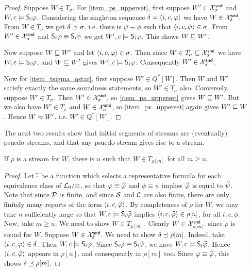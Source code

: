 \begin{proof}

    Suppose $W \in T_\sigma$. For \cref{item_ps_upperset}, first suppose $W'
    \in \Xsnd_\sigma$ and $W, c \models \S_i\phi$.  Considering the singleton
    sequence $\delta = \tuple{i, c, \phi}$ we have $W \in \Xsnd_\delta$. From
    $W \in T_\sigma$ we get $\delta \seqss \sigma$, i.e. there is $\psi \equiv
    \phi$ such that $\tuple{i, c, \psi} \in \sigma$. From $W' \in \Xsnd_\sigma$
    and $\S_i\phi \equiv \S_i\psi$ we get $W', c \models \S_i\phi$.  This shows
    $W \specleq W'$.

    Now suppose $W \specleq W'$ and let $\tuple{i, c, \phi} \in \sigma$. Then
    since $W \in T_\sigma \subseteq \Xsnd_\sigma$ we have $W, c \models
    \S_i\phi$, and $W \specleq W'$ gives $W', c \models \S_i\phi$. Consequently
    $W' \in \Xsnd_\sigma$.

    Now for \cref{item_tsigma_qstar}, first suppose $W' \in Q^*[W]$. Then $W$
    and $W'$ satisfy exactly the same soundness statements, so $W' \in
    T_\sigma$ also.
    Conversely, suppose $W' \in T_\sigma$. Then $W' \in \Xsnd_\sigma$, so
    \cref{item_ps_upperset} gives $W \specleq W'$.  But we also have $W' \in
    T_\sigma$ and $W \in \Xsnd_\sigma$, so \cref{item_ps_upperset} again gives
    $W' \specleq W$. Hence $W \speceq W'$, i.e. $W' \in Q^*[W]$.
\end{proof}

The next two results show that initial segments of streams are (eventually)
psuedo-streams, and that any psuedo-stream gives rise to a stream.

\begin{lemma}
    \label{lemma_stream_to_pseudostream}
    If $\rho$ is a stream for $W$, there is $n$ such that $W \in T_{\rho[m]}$
    for all $m \ge n$.
\end{lemma}

\begin{proof}

    Let $\repr{\cdot}$ be a function which selects a representative formula for
    each equivalence class of $\Lprop / {\equiv}$, so that $\phi \equiv
    \repr{\phi}$ and $\phi \equiv \psi$ implies $\repr{\phi}$ is equal to
    $\repr{\psi}$. Note that since $\propvars$ is finite, and since $\srcs$ and
    $\css$ are also finite, there are only finitely many reports of the form
    $\tuple{i, c, \repr{\phi}}$. By completeness of $\rho$ for $W$, we may take
    $n$ sufficiently large so that $W, c \models \S_i{\repr{\phi}}$ implies
    $\tuple{i, c, \repr{\phi}} \in \rho[n]$, for all $i, c, \phi$.
    Now, take $m \ge n$. We need to show $W \in T_{\rho[m]}$. Clearly $W \in
    \Xsnd_{\rho[m]}$, since $\rho$ is sound for $W$. Suppose $W \in
    \Xsnd_\delta$. We need to show $\delta \seqss \rho[m]$. Indeed, take
    $\tuple{i, c, \phi} \in \delta$. Then $W, c \models \S_i\phi$. Since
    $\S_i\phi \equiv \S_i{\repr{\phi}}$, we have $W, c \models
    \S_i{\repr{\phi}}$. Hence $\tuple{i, c, \repr{\phi}}$ appears in $\rho[n]$,
    and consequently in $\rho[m]$ too. Since $\phi \equiv \repr{\phi}$, this
    shows $\delta \seqss \rho[m]$.
\end{proof}

